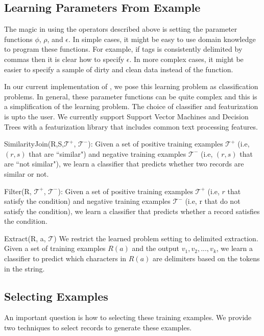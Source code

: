 \subsection{Learning Parameters From Example}
The magic in using the operators described above is setting the parameter functions $\phi$, $\rho$, and $\epsilon$.
In simple cases, it might be easy to use domain knowledge to program these functions. 
For example, if \textsf{tags} is consistently delimited by commas then it is clear how to specify $\epsilon$.
In more complex cases, it might be easier to specify a sample of dirty and clean data instead of the function.

In our current implementation of \projx, we pose this learning problem as classification problems.
In general, these parameter functions can be quite complex and this is a simplification of the learning problem.
The choice of classifier and featurization is upto the user. We currently support Support Vector Machines and Decision Trees with a featurization library that includes common text processing features.

\vspace{0.5em}

\noindent \textsf{SimilarityJoin(R,S,$\mathcal{T}^+$, $\mathcal{T}^-$)}: Given a set of positive training examples $\mathcal{T}^+$ (i.e, $(r,s)$ that are ``similar") and
negative training examples $\mathcal{T}^-$ (i.e, $(r,s)$ that are  ``not similar"), we learn a classifier that predicts whether two records are similar or not. 

\vspace{0.5em}


\noindent \textsf{Filter(R, $\mathcal{T}^+$, $\mathcal{T}^-$)}: Given a set of positive training examples $\mathcal{T}^+$ (i.e, $r$ that satisfy the condition) and
negative training examples $\mathcal{T}^-$ (i.e, r that do not satisfy the condition), we learn a classifier that predicts whether a record satisfies the condition. 

\vspace{0.5em}

\noindent \textsf{Extract(R, a, $\mathcal{T}$)} We restrict the learned problem setting to delimited extraction. Given a set of training examples $R(a)$ and the output $v_1,v_2,...,v_k$, we learn a classifier to predict which characters in $R(a)$ are delimiters based on the tokens in the string.

\subsection{Selecting Examples}
An important question is how to selecting these training examples. 
We provide two techniques to select records to generate these examples.

